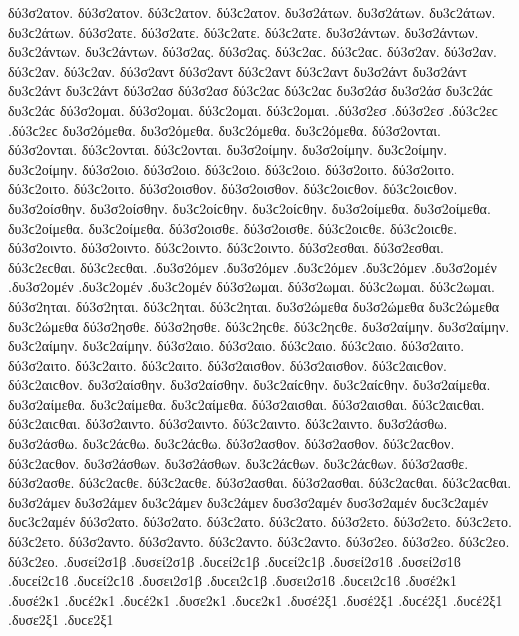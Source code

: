 {δύ3σ2ατον. δύ3σ2ατον. δύ3ϲ2ατον. δύ3ϲ2ατον.
δυ3σ2άτων. δυ3σ2άτων. δυ3ϲ2άτων. δυ3ϲ2άτων.
δύ3σ2ατε. δύ3σ2ατε. δύ3ϲ2ατε. δύ3ϲ2ατε.
δυ3σ2άντων. δυ3σ2άντων. δυ3ϲ2άντων. δυ3ϲ2άντων.
δύ3σ2ας. δύ3σ2ας. δύ3ϲ2αϲ. δύ3ϲ2αϲ. δύ3σ2αν. δύ3σ2αν. δύ3ϲ2αν. δύ3ϲ2αν. δύ3σ2αντ δύ3σ2αντ δύ3ϲ2αντ δύ3ϲ2αντ δυ3σ2άντ δυ3σ2άντ δυ3ϲ2άντ δυ3ϲ2άντ
δύ3σ2ασ δύ3σ2ασ δύ3ϲ2αϲ δύ3ϲ2αϲ δυ3σ2άσ δυ3σ2άσ δυ3ϲ2άϲ δυ3ϲ2άϲ
δύ3σ2ομαι. δύ3σ2ομαι. δύ3ϲ2ομαι. δύ3ϲ2ομαι.
.δύ3σ2εσ .δύ3σ2εσ .δύ3ϲ2εϲ .δύ3ϲ2εϲ
δυ3σ2όμεθα. δυ3σ2όμεθα. δυ3ϲ2όμεθα. δυ3ϲ2όμεθα.
δύ3σ2ονται. δύ3σ2ονται. δύ3ϲ2ονται. δύ3ϲ2ονται.
δυ3σ2οίμην. δυ3σ2οίμην. δυ3ϲ2οίμην. δυ3ϲ2οίμην.
δύ3σ2οιο. δύ3σ2οιο. δύ3ϲ2οιο. δύ3ϲ2οιο.
δύ3σ2οιτο. δύ3σ2οιτο. δύ3ϲ2οιτο. δύ3ϲ2οιτο.
δύ3σ2οισθον. δύ3σ2οισθον. δύ3ϲ2οιϲθον. δύ3ϲ2οιϲθον.
δυ3σ2οίσθην. δυ3σ2οίσθην. δυ3ϲ2οίϲθην. δυ3ϲ2οίϲθην.
δυ3σ2οίμεθα. δυ3σ2οίμεθα. δυ3ϲ2οίμεθα. δυ3ϲ2οίμεθα.
δύ3σ2οισθε. δύ3σ2οισθε. δύ3ϲ2οιϲθε. δύ3ϲ2οιϲθε.
δύ3σ2οιντο. δύ3σ2οιντο. δύ3ϲ2οιντο. δύ3ϲ2οιντο.
δύ3σ2εσθαι. δύ3σ2εσθαι. δύ3ϲ2εϲθαι. δύ3ϲ2εϲθαι.
.δυ3σ2όμεν .δυ3σ2όμεν .δυ3ϲ2όμεν .δυ3ϲ2όμεν   %
.δυ3σ2ομέν .δυ3σ2ομέν .δυ3ϲ2ομέν .δυ3ϲ2ομέν
δύ3σ2ωμαι. δύ3σ2ωμαι. δύ3ϲ2ωμαι. δύ3ϲ2ωμαι.
δύ3σ2ηται. δύ3σ2ηται. δύ3ϲ2ηται. δύ3ϲ2ηται.
δυ3σ2ώμεθα δυ3σ2ώμεθα δυ3ϲ2ώμεθα δυ3ϲ2ώμεθα
δύ3σ2ησθε. δύ3σ2ησθε. δύ3ϲ2ηϲθε. δύ3ϲ2ηϲθε.
δυ3σ2αίμην. δυ3σ2αίμην. δυ3ϲ2αίμην. δυ3ϲ2αίμην.
δύ3σ2αιο. δύ3σ2αιο. δύ3ϲ2αιο. δύ3ϲ2αιο.
δύ3σ2αιτο. δύ3σ2αιτο. δύ3ϲ2αιτο. δύ3ϲ2αιτο.
δύ3σ2αισθον. δύ3σ2αισθον. δύ3ϲ2αιϲθον. δύ3ϲ2αιϲθον.
δυ3σ2αίσθην. δυ3σ2αίσθην. δυ3ϲ2αίϲθην. δυ3ϲ2αίϲθην.
δυ3σ2αίμεθα. δυ3σ2αίμεθα. δυ3ϲ2αίμεθα. δυ3ϲ2αίμεθα.
δύ3σ2αισθαι. δύ3σ2αισθαι. δύ3ϲ2αιϲθαι. δύ3ϲ2αιϲθαι.
δύ3σ2αιντο. δύ3σ2αιντο. δύ3ϲ2αιντο. δύ3ϲ2αιντο.
δυ3σ2άσθω. δυ3σ2άσθω. δυ3ϲ2άϲθω. δυ3ϲ2άϲθω.
δύ3σ2ασθον. δύ3σ2ασθον. δύ3ϲ2αϲθον. δύ3ϲ2αϲθον.
δυ3σ2άσθων. δυ3σ2άσθων. δυ3ϲ2άϲθων. δυ3ϲ2άϲθων.
δύ3σ2ασθε. δύ3σ2ασθε. δύ3ϲ2αϲθε. δύ3ϲ2αϲθε.
δύ3σ2ασθαι. δύ3σ2ασθαι. δύ3ϲ2αϲθαι. δύ3ϲ2αϲθαι.
δυ3σ2άμεν δυ3σ2άμεν δυ3ϲ2άμεν δυ3ϲ2άμεν   %
δυσ3σ2αμέν δυσ3σ2αμέν δυϲ3ϲ2αμέν δυϲ3ϲ2αμέν
δύ3σ2ατο. δύ3σ2ατο. δύ3ϲ2ατο. δύ3ϲ2ατο.   %
δύ3σ2ετο. δύ3σ2ετο. δύ3ϲ2ετο. δύ3ϲ2ετο.   %
δύ3σ2αντο. δύ3σ2αντο. δύ3ϲ2αντο. δύ3ϲ2αντο.   %
δύ3σ2εο. δύ3σ2εο. δύ3ϲ2εο. δύ3ϲ2εο.   %
.δυσεί2σ1β .δυσεί2σ1β .δυϲεί2ϲ1β .δυϲεί2ϲ1β .δυσεί2σ1ϐ .δυσεί2σ1ϐ .δυϲεί2ϲ1ϐ .δυϲεί2ϲ1ϐ %
.δυσει2σ1β .δυϲει2ϲ1β .δυσει2σ1ϐ .δυϲει2ϲ1ϐ
.δυσέ2κ1 .δυσέ2κ1 .δυϲέ2κ1 .δυϲέ2κ1   %
.δυσε2κ1 .δυϲε2κ1
.δυσέ2ξ1 .δυσέ2ξ1 .δυϲέ2ξ1 .δυϲέ2ξ1   %
.δυσε2ξ1 .δυϲε2ξ1
}
